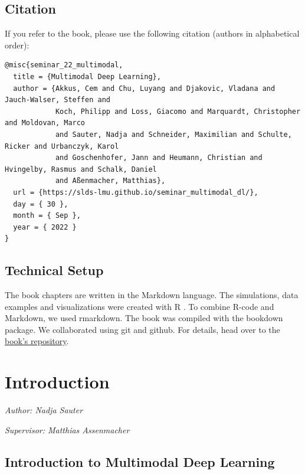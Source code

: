\documentclass[
]{krantz}
\begin{document}
\hypertarget{citation}{%
\section{Citation}\label{citation}}

If you refer to the book, please use the following citation (authors in alphabetical order):

\begin{verbatim}
@misc{seminar_22_multimodal,
  title = {Multimodal Deep Learning},
  author = {Akkus, Cem and Chu, Luyang and Djakovic, Vladana and Jauch-Walser, Steffen and
            Koch, Philipp and Loss, Giacomo and Marquardt, Christopher and Moldovan, Marco
            and Sauter, Nadja and Schneider, Maximilian and Schulte, Ricker and Urbanczyk, Karol
            and Goschenhofer, Jann and Heumann, Christian and Hvingelby, Rasmus and Schalk, Daniel
            and Aßenmacher, Matthias},
  url = {https://slds-lmu.github.io/seminar_multimodal_dl/},
  day = { 30 },
  month = { Sep },
  year = { 2022 }
}
\end{verbatim}

\hypertarget{technical-setup}{%
\section*{Technical Setup}\label{technical-setup}}


The book chapters are written in the Markdown language.
The simulations, data examples and visualizations were created with R \citep{rlang}.
To combine R-code and Markdown, we used rmarkdown.
The book was compiled with the bookdown package.
We collaborated using git and github.
For details, head over to the \href{https://github.com/slds-lmu/seminar_multimodal_dl}{book's repository}.

\hypertarget{introduction}{%
\chapter{Introduction}\label{introduction}}

\emph{Author: Nadja Sauter}

\emph{Supervisor: Matthias Assenmacher}

\hypertarget{introduction-to-multimodal-deep-learning}{%
\section{Introduction to Multimodal Deep Learning}\label{introduction-to-multimodal-deep-learning}}
\end{document}
